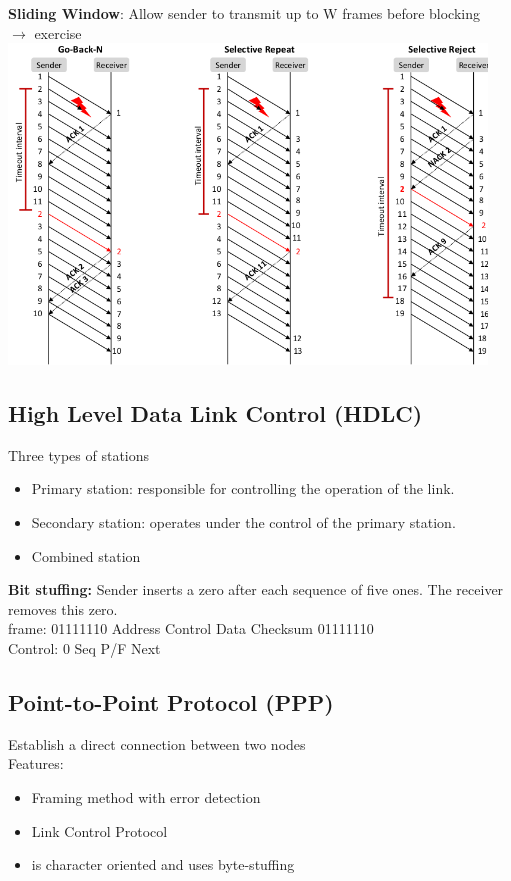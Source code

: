 \documentclass[11pt,ngerman]{article}
\begin{document}
\textbf{Sliding Window}: Allow	sender	to	transmit	up	to	W
frames	before	blocking\\
 $\rightarrow$ exercise\\
\includegraphics[width=5in]{images/Selection_017.png}

\subsection{High	Level	Data	Link	Control	(HDLC)}
Three	types	of	stations
\begin{itemize}[noitemsep,nolistsep]
\item Primary	station:	responsible	for	controlling	the	operation	of	the	link.	
\item Secondary	station:	operates	under	the	control	of	the	primary	station.	
\item Combined	station
\end{itemize}

\noindent \textbf{Bit stuffing:} Sender	inserts	a	zero	after	each	sequence	of	five	ones.	The	receiver	removes	this	
zero.\\
frame: 01111110 Address Control Data Checksum 01111110 \\
Control: 0 Seq P/F Next

\subsection{Point-to-Point	Protocol	(PPP)}
Establish	a	direct	connection	between	two	nodes\\
Features:
\begin{itemize}[noitemsep,nolistsep]
\item Framing	method	with	error	detection
\item Link	Control	Protocol
\item is	character	oriented	and	uses	byte-stuffing
\end{itemize}
\end{document}
